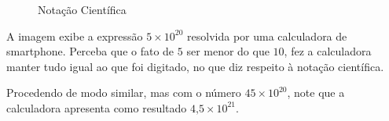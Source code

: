 \begin{figure}[H]
\begin{tikzpicture}[every node/.style={scale=1.2}]
\end{tikzpicture}
\caption{Notação Científica}
\end{figure}

A imagem exibe a expressão $5 \times 10^{20}$ resolvida por uma calculadora de smartphone. Perceba que o fato de $5$ ser menor do que $10$, fez a calculadora manter tudo igual ao que foi digitado, no que diz respeito à notação científica.

Procedendo de modo similar, mas com o número $45 \times 10^{20}$, note que a calculadora apresenta como resultado $4\text{,}5 \times 10^{21}$.


